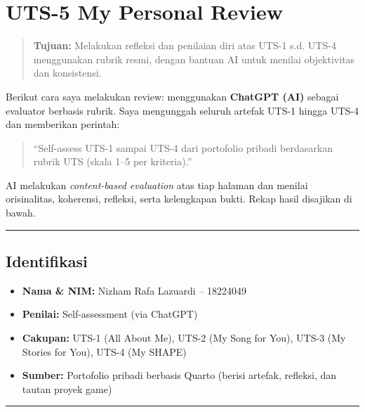 \documentclass[
  letterpaper,
  DIV=11,
  numbers=noendperiod]{scrreprt}
\providecommand{\tightlist}{%
  \setlength{\itemsep}{0pt}\setlength{\parskip}{0pt}}
\begin{document}

\chapter{UTS-5 My Personal Review}\label{uts-5-my-personal-review}

\begin{quote}
\textbf{Tujuan:} Melakukan refleksi dan penilaian diri atas UTS-1 s.d.
UTS-4 menggunakan rubrik resmi, dengan bantuan AI untuk menilai
objektivitas dan konsistensi.
\end{quote}

Berikut cara saya melakukan review: menggunakan \textbf{ChatGPT (AI)}
sebagai evaluator berbasis rubrik. Saya mengunggah seluruh artefak UTS-1
hingga UTS-4 dan memberikan perintah:

\begin{quote}
``Self-assess UTS-1 sampai UTS-4 dari portofolio pribadi berdasarkan
rubrik UTS (skala 1--5 per kriteria).''
\end{quote}

AI melakukan \emph{content-based evaluation} atas tiap halaman dan
menilai orisinalitas, koherensi, refleksi, serta kelengkapan bukti.
Rekap hasil disajikan di bawah.

\begin{center}\rule{0.5\linewidth}{0.5pt}\end{center}

\section{Identifikasi}\label{identifikasi}

\begin{itemize}
\tightlist
\item
  \textbf{Nama \& NIM:} Nizham Rafa Lazuardi -- 18224049\\
\item
  \textbf{Penilai:} Self-assessment (via ChatGPT)\\
\item
  \textbf{Cakupan:} UTS-1 (All About Me), UTS-2 (My Song for You), UTS-3
  (My Stories for You), UTS-4 (My SHAPE)\\
\item
  \textbf{Sumber:} Portofolio pribadi berbasis Quarto (berisi artefak,
  refleksi, dan tautan proyek game)
\end{itemize}

\begin{center}\rule{0.5\linewidth}{0.5pt}\end{center}
\end{document}
